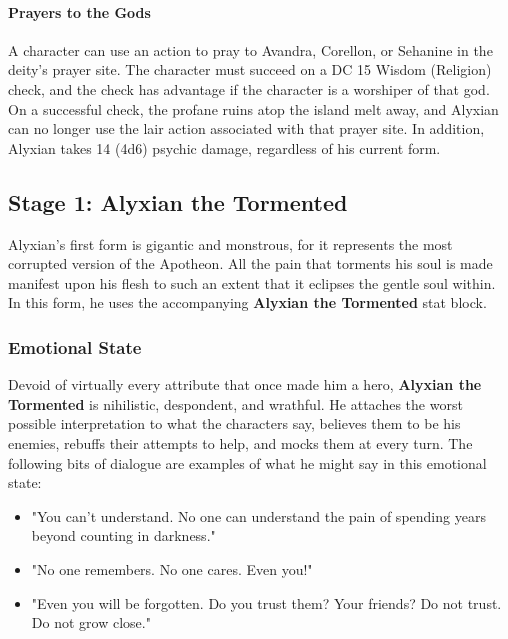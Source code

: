 \documentclass[10pt,a4,twoside,twocolumn,openany,nodeprecatedcode]{dndbook}
\begin{document}
\paragraph{Prayers to the Gods}
A character can use an action to pray to Avandra, Corellon, or Sehanine in the deity's prayer site. The character must succeed on a DC 15 Wisdom (Religion) check, and the check has advantage if the character is a worshiper of that god. On a successful check, the profane ruins atop the island melt away, and Alyxian can no longer use the lair action associated with that prayer site. In addition, Alyxian takes 14 (4d6) psychic damage, regardless of his current form.
\subsection{Stage 1: Alyxian the Tormented}
Alyxian's first form is gigantic and monstrous, for it represents the most corrupted version of the Apotheon. All the pain that torments his soul is made manifest upon his flesh to such an extent that it eclipses the gentle soul within. In this form, he uses the accompanying \textbf{Alyxian the Tormented} stat block.
\subsubsection{Emotional State}
Devoid of virtually every attribute that once made him a hero, \textbf{Alyxian the Tormented} is nihilistic, despondent, and wrathful. He attaches the worst possible interpretation to what the characters say, believes them to be his enemies, rebuffs their attempts to help, and mocks them at every turn.
The following bits of dialogue are examples of what he might say in this emotional state:
\begin{itemize}

\item "You can't understand. No one can understand the pain of spending years beyond counting in darkness."
\item "No one remembers. No one cares. Even you!"
\item "Even you will be forgotten. Do you trust them? Your friends? Do not trust. Do not grow close."
\end{itemize}
\end{document}
